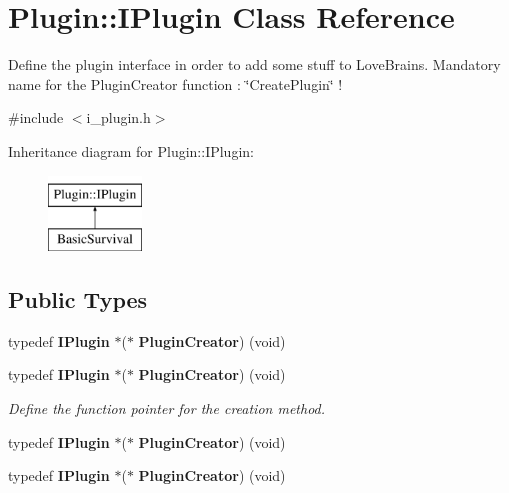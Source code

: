 \section{Plugin\+:\+:I\+Plugin Class Reference}
\label{class_plugin_1_1_i_plugin}


Define the plugin interface in order to add some stuff to Love\+Brains. Mandatory name for the Plugin\+Creator function \+: \char`\"{}\+Create\+Plugin\char`\"{} !  




{\ttfamily \#include $<$i\+\_\+plugin.\+h$>$}

Inheritance diagram for Plugin\+:\+:I\+Plugin\+:\begin{figure}[H]
\begin{center}
\leavevmode
\includegraphics[height=2.000000cm]{class_plugin_1_1_i_plugin}
\end{center}
\end{figure}
\subsection*{Public Types}
\begin{DoxyCompactItemize}
\item 
typedef {\bf I\+Plugin} $\ast$($\ast$ {\bfseries Plugin\+Creator}) (void)\label{class_plugin_1_1_i_plugin_acabdfce5c711ade0685f6d92b3200fd9}

\item 
typedef {\bf I\+Plugin} $\ast$($\ast$ {\bf Plugin\+Creator}) (void)\label{class_plugin_1_1_i_plugin_acabdfce5c711ade0685f6d92b3200fd9}

\begin{DoxyCompactList}\small\item\em Define the function pointer for the creation method. \end{DoxyCompactList}\item 
typedef {\bf I\+Plugin} $\ast$($\ast$ {\bfseries Plugin\+Creator}) (void)\label{class_plugin_1_1_i_plugin_acabdfce5c711ade0685f6d92b3200fd9}

\item 
typedef {\bf I\+Plugin} $\ast$($\ast$ {\bfseries Plugin\+Creator}) (void)\label{class_plugin_1_1_i_plugin_acabdfce5c711ade0685f6d92b3200fd9}

\end{DoxyCompactItemize}
